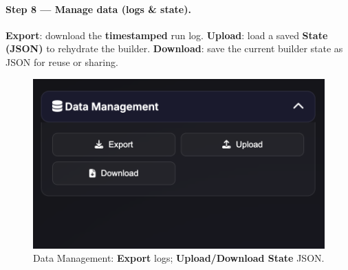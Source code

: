 \documentclass[
    twocolumn,
    fontsize = 10pt,
    parskip = half+,
    headings = small,
    headwidth = text,
    footwidth = text,
]{scrartcl}
\begin{document}
\paragraph{\textbf{Step 8 — Manage data (logs \& state).}}
\textbf{Export}: download the \textbf{timestamped} run log. 
\textbf{Upload}: load a saved \textbf{State (JSON)} to rehydrate the builder. 
\textbf{Download}: save the current builder state as JSON for reuse or sharing.
\begin{figure}[htbp]\centering
  \includegraphics[width=.9\linewidth]{pics/sb-7.png}
  \caption{Data Management: \textbf{Export} logs; \textbf{Upload/Download State} JSON.}
  \label{fig:sb-7}
\end{figure}
\end{document}
